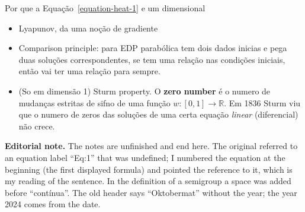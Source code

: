 Por que a Equação~\ref{equation-heat-1} e um
dimensional

\begin{itemize}
\item Lyapunov, da uma noção de gradiente
\item Comparison principle: para EDP
parabólica tem dois dados inicias e pega duas
soluções correspondentes, se tem uma relação
nas condições iniciais, então vai ter uma
relação para sempre.
\item (So em dimensão 1) Sturm property. O
{\bf zero number}  é o numero de mudanças
estritas de sifno de uma função $w:[0,1]\to
\mathbb{R}$. Em 1836 Sturm viu que o numero
de zeros das soluções de uma certa equação
{\it linear} (diferencial) não crece.
\end{itemize}

\medskip\noindent
{\bf Editorial note.}
The notes are unfinished and end here.
The original referred to an equation
label ``Eq:1'' that was undefined; I
numbered the equation at the beginning
(the first displayed formula) and pointed
the reference to it, which is my reading
of the sentence. In the definition of a
semigroup a space was added before
``contínua''. The old header says
``Oktobermat'' without the year; the
year 2024 comes from the date.





